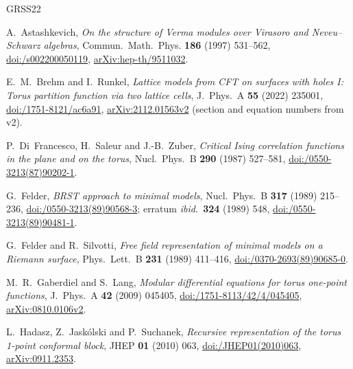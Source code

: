 \documentclass[twoside,10pt]{article}
\numberwithin{equation}{section}
\theoremstyle{slbody}
\theoremstyle{definition}
\theoremstyle{remark}
\begin{document}
{\small
\begin{thebibliography}{GRSS22}
\setlength{\itemsep}{0pt plus 0.5pt}
\setlength{\parskip}{0pt}

A.~Astashkevich,
\emph{On the structure of Verma modules over Virasoro and
Neveu--Schwarz algebras},
Commun.\ Math.\ Phys. \textbf{186} (1997) 531--562,
\href{https://doi.org/10.1007/s002200050119}%
{doi:/s002200050119},
\href{https://arxiv.org/abs/hep-th/9511032}{arXiv:hep-th/9511032}.

E.~M.~Brehm and I.~Runkel,
\emph{Lattice models from CFT on surfaces with holes I: Torus partition
function via two lattice cells},
J.\ Phys.\ A \textbf{55} (2022) 235001,
\href{https://doi.org/10.1088/1751-8121/ac6a91}%
{doi:/1751-8121/ac6a91},
\href{https://arxiv.org/abs/2112.01563v2}{arXiv:2112.01563v2}
(section and equation numbers from v2).

P.~Di~Francesco, H.~Saleur and J.-B.~Zuber,
\emph{Critical Ising correlation functions in the plane and on the torus},
Nucl.\ Phys.\ B \textbf{290} (1987) 527--581,
\href{https://doi.org/10.1016/0550-3213(87)90202-1}%
{doi:/0550-3213(87)90202-1}.

G.~Felder,
\emph{BRST approach to minimal models},
Nucl.\ Phys.\ B \textbf{317} (1989) 215--236,
\href{https://doi.org/10.1016/0550-3213(89)90568-3}{doi:/0550-3213(89)90568-3};
erratum \emph{ibid.}\ \textbf{324} (1989) 548,
\href{https://doi.org/10.1016/0550-3213(89)90481-1}{doi:/0550-3213(89)90481-1}.

G.~Felder and R.~Silvotti,
\emph{Free field representation of minimal models on a Riemann surface},
Phys.\ Lett.\ B \textbf{231} (1989) 411--416,
\href{https://doi.org/10.1016/0370-2693(89)90685-0}{doi:/0370-2693(89)90685-0}.

M.~R.~Gaberdiel and S.~Lang,
\emph{Modular differential equations for torus one-point functions},
J.\ Phys.\ A \textbf{42} (2009) 045405,
\href{https://doi.org/10.1088/1751-8113/42/4/045405}%
{doi:/1751-8113/42/4/045405},
\href{https://arxiv.org/abs/0810.0106v2}{arXiv:0810.0106v2}.

L.~Hadasz, Z.~Jask\'olski and P.~Suchanek,
\emph{Recursive representation of the torus 1-point conformal block},
JHEP \textbf{01} (2010) 063,
\href{https://doi.org/10.1007/JHEP01(2010)063}%
{doi:/JHEP01(2010)063},
\href{https://arxiv.org/abs/0911.2353}{arXiv:0911.2353}.


\end{thebibliography}}
\end{document}
